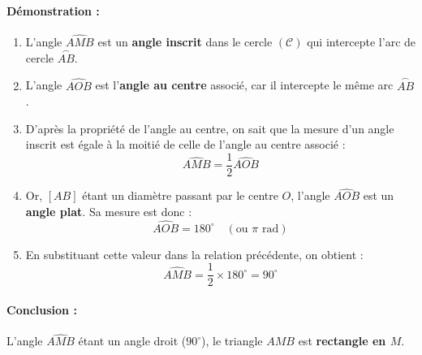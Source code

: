 \documentclass[12pt,a4paper]{article}
\begin{document}
\paragraph{Démonstration :}
\begin{enumerate}
    \item L'angle $\widehat{AMB}$ est un \textbf{angle inscrit} dans le cercle $(\mathcal{C})$ qui intercepte l'arc de cercle $\overset{\frown}{AB}$.
    \item L'angle $\widehat{AOB}$ est l'\textbf{angle au centre} associé, car il intercepte le même arc $\overset{\frown}{AB}$.
    \item D'après la propriété de l'angle au centre, on sait que la mesure d'un angle inscrit est égale à la moitié de celle de l'angle au centre associé :
    \[ \widehat{AMB} = \frac{1}{2} \widehat{AOB} \]
    \item Or, $[AB]$ étant un diamètre passant par le centre $O$, l'angle $\widehat{AOB}$ est un \textbf{angle plat}. Sa mesure est donc :
    \[ \widehat{AOB} = 180^\circ \quad (\text{ou } \pi \text{ rad}) \]
    \item En substituant cette valeur dans la relation précédente, on obtient :
    \[ \widehat{AMB} = \frac{1}{2} \times 180^\circ = 90^\circ \]
\end{enumerate}

\paragraph{Conclusion :}
L'angle $\widehat{AMB}$ étant un angle droit ($90^\circ$), le triangle $AMB$ est \textbf{rectangle en $M$}.

\begin{center}
\end{center}
\end{document}
